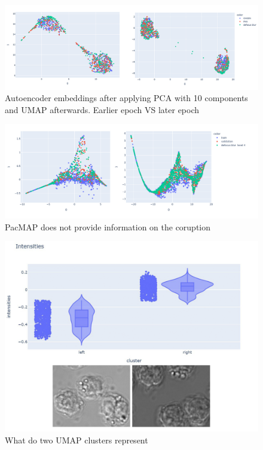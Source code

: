 \begin{figure}[htb]
	\begin{center}
		\includegraphics[width=0.5\linewidth]{bilder/ae-embeddings/pca-umap-clusters.png}
		\caption{Autoencoder embeddings after applying PCA with 10 components and UMAP afterwards. Earlier epoch VS later epoch}\label{fig:ae-pca-umap-clustered}
	\end{center}
\end{figure}

\begin{figure}[htb]
	\begin{center}
		\includegraphics[width=0.5\linewidth]{bilder/ae-embeddings/pacmap.png}
		\caption{PacMAP does not provide information on the coruption}\label{fig:ae-pacmap}
	\end{center}
\end{figure}

\begin{figure}[htb]
	\begin{center}
		\includegraphics[width=0.5\linewidth]{bilder/ae-embeddings/brighter-darker.png}
		\caption{What do two UMAP clusters represent}\label{fig:ae-brighter-darker}
	\end{center}
\end{figure}



